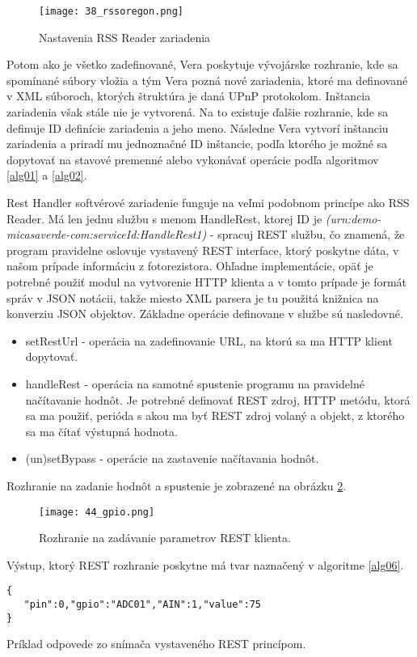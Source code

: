 \begin{figure}[!htbp]
\centering
\texttt{[image: 38\_rssoregon.png]}
\caption{Nastavenia RSS Reader zariadenia}
\label{38_rssoregon}
\end{figure} 
Potom ako je všetko zadefinované, Vera poskytuje vývojárske rozhranie, kde sa spomínané súbory vložia a tým Vera pozná nové zariadenia, ktoré ma definované v XML súboroch, ktorých štruktúra je daná UPnP protokolom. Inštancia zariadenia však stále nie je vytvorená. Na to existuje ďalšie rozhranie, kde sa definuje ID definície zariadenia a jeho meno. Následne Vera vytvorí inštanciu zariadenia a priradí mu jednoznačné ID inštancie, podľa ktorého je možné sa dopytovať na stavové premenné alebo vykonávať operácie podľa algoritmov \ref{alg01} a \ref{alg02}.

\indent Rest Handler softvérové zariadenie funguje na veľmi podobnom princípe ako RSS Reader. Má len jednu službu s menom HandleRest, ktorej ID je  \textit{(urn:demo-micasaverde-com:serviceId:HandleRest1)} - spracuj REST službu, čo znamená, že program pravidelne oslovuje vystavený REST interface, ktorý poskytne dáta, v našom prípade informáciu z fotorezistora. Ohľadne implementácie, opäť je potrebné použiť modul na vytvorenie HTTP klienta a v tomto prípade je formát správ v JSON notácii, takže miesto XML parsera je tu použitá knižnica \cite{IOT30} na konverziu JSON objektov. Základne operácie definovane v službe sú nasledovné.
\begin{itemize}
\item setRestUrl - operácia na zadefinovanie URL, na ktorú sa ma HTTP klient dopytovať.
\item handleRest - operácia na samotné spustenie programu na pravidelné načítavanie hodnôt. Je potrebné definovať REST zdroj, HTTP metódu, ktorá sa ma použiť, perióda s akou ma byť REST zdroj volaný a objekt, z ktorého sa ma čítať výstupná hodnota.
\item (un)setBypass - operácie na zastavenie načítavania hodnôt.
\end{itemize}
Rozhranie na zadanie hodnôt a spustenie je zobrazené na obrázku \ref{44_gpio}.
\begin{figure}[!htbp]
\centering
\texttt{[image: 44\_gpio.png]}
\caption{Rozhranie na zadávanie parametrov REST klienta.}
\label{44_gpio}
\end{figure} 
Výstup, ktorý REST rozhranie poskytne má tvar naznačený v algoritme \ref{alg06}.
\begin{algorithm}
%
\begin{lstlisting}
{
   "pin":0,"gpio":"ADC01","AIN":1,"value":75
}
\end{lstlisting}
 \caption{Príklad odpovede zo snímača vystaveného REST princípom.}
 \label{alg06}
\end{algorithm}  
